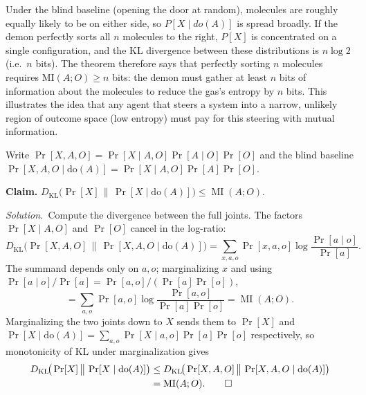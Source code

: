 \documentclass[11pt]{article}
\newcommand{\DKL}{D_{\mathrm{KL}}}
\DeclareMathOperator{\MI}{MI}
\newcommand{\doo}[1]{\mathrm{do}(#1)}
\newcommand{\soln}{\medskip\noindent\textit{Solution.}\ }
\begin{document}
\begin{exercise}
\begin{remark}
\medskip
\noindent
Under the blind baseline (opening the door at random), molecules are roughly equally
likely to be on either side, so $P[X \mid do(A)]$ is spread broadly. If the demon
perfectly sorts all $n$ molecules to the right, $P[X]$ is concentrated on a single
configuration, and the KL divergence between these distributions is $n \log 2$ (i.e.\
$n$ bits). The theorem therefore says that perfectly sorting $n$ molecules requires
$\mathrm{MI}(A; O) \geq n$ bits: the demon must gather at least $n$ bits of
information about the molecules to reduce the gas's entropy by $n$ bits.
This illustrates the idea that any agent that steers a system into a narrow, unlikely region of outcome space (low entropy) must pay for this steering with mutual information. 
\end{remark}
\end{exercise}

\begin{solution}[ex:do-divergence]
Write $\Pr[X,A,O]=\Pr[X\mid A,O]\Pr[A\mid O]\Pr[O]$ and the blind baseline $\Pr[X,A,O\mid\doo{A}]=\Pr[X\mid A,O]\Pr[A]\Pr[O]$.

\textbf{Claim.}
$\DKL\!\big(\Pr[X]\,\big\|\,\Pr[X\mid\doo{A}]\big)\le\MI(A;O)$.


\soln Compute the divergence between the full joints. The factors $\Pr[X\mid A,O]$ and $\Pr[O]$ cancel in the log-ratio:
\[
  \DKL\!\big(\Pr[X,A,O]\,\big\|\,\Pr[X,A,O\mid\doo{A}]\big)
  =\sum_{x,a,o}\Pr[x,a,o]\log\frac{\Pr[a\mid o]}{\Pr[a]}.
\]
The summand depends only on $a,o$; marginalizing $x$ and using $\Pr[a\mid o]/\Pr[a]=\Pr[a,o]/(\Pr[a]\Pr[o])$,
\[
  =\sum_{a,o}\Pr[a,o]\log\frac{\Pr[a,o]}{\Pr[a]\Pr[o]}=\MI(A;O).
\]
Marginalizing the two joints down to $X$ sends them to $\Pr[X]$ and $\Pr[X\mid\doo{A}]=\sum_{a,o}\Pr[X\mid a,o]\Pr[a]\Pr[o]$ respectively, so monotonicity of KL under marginalization gives
\begin{align*}
  \DKL\!\big(\Pr[X]\,\big\|\,\Pr[X\mid\doo{A}]\big)
  &\le\DKL\!\big(\Pr[X,A,O]\,\big\|\,\Pr[X,A,O\mid\doo{A}]\big)\\
  &=\MI(A;O). \qedhere
\end{align*}
\end{solution}
\end{document}
